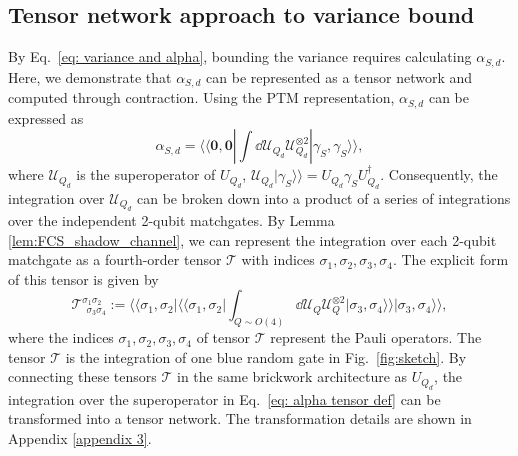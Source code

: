 \documentclass[showpacs,onecolumn,aps,prx,long bibliography,superscriptaddress,notitlepage]{revtex4-1}
\newcommand{\supket}[1]{|#1 \rangle\rangle}
\newcommand{\supbra}[1]{\langle\langle #1 |}
\newcommand{\Tcal}{\mathcal{T}}
\newcommand{\Ucal}{\mathcal{U}}
\begin{document}
\subsection{Tensor network approach to variance bound}

By Eq.~\eqref{eq: variance and alpha}, bounding the variance requires calculating $\alpha_{S,d}$. Here, we demonstrate that $\alpha_{S,d}$ can be represented as a tensor network and computed through contraction.
Using the PTM representation, $\alpha_{S,d}$ can be expressed as
\begin{equation}
\label{eq: alpha tensor def}
\alpha_{S,d} = \supbra{\bm 0,\bm 0}  \int \dd \Ucal_{Q_d} \mathcal{U}_{Q_d}^{\otimes 2} \supket{\gamma_S, \gamma_S},
\end{equation}
where $\mathcal{U}_{Q_d}$ is the superoperator of ${U}_{Q_d}$, $\mathcal{U}_{Q_d} \supket{\gamma_S} = U_{Q_d} \gamma_S U_{Q_d}^\dagger$.
Consequently, the integration over $\Ucal_{Q_d}$ can be broken down into a product of a series of integrations over the independent 2-qubit matchgates. 
By Lemma \ref{lem:FCS_shadow_channel}, we can represent the integration over each 2-qubit matchgate as a fourth-order tensor $\Tcal$ with indices $\sigma_1,\sigma_2, \sigma_3, \sigma_4$. The explicit form of this tensor is given by
\begin{equation}
\label{eq: T}
    \Tcal^{\sigma_1\sigma_2}_{~~\sigma_3\sigma_4} := \supbra{\sigma_1, \sigma_2}\supbra{\sigma_1, \sigma_2}\int_{Q\sim O(4)} \dd \Ucal_{Q} \mathcal{U}_{Q}^{\otimes 2} \supket{\sigma_3, \sigma_4}\supket{\sigma_3, \sigma_4},
\end{equation}
where the indices $\sigma_1, \sigma_2, \sigma_3, \sigma_4$ of tensor $\Tcal$ represent the Pauli operators. The tensor $\Tcal$ is the integration of one blue random gate in Fig.~\ref{fig:sketch}. 
By connecting these tensors $\Tcal$ in the same brickwork architecture as $ U_{Q_d} $, the integration over the superoperator in Eq.~\eqref{eq: alpha tensor def} can be transformed into a tensor network. The transformation details are shown in Appendix \ref{appendix 3}.
\end{document}

